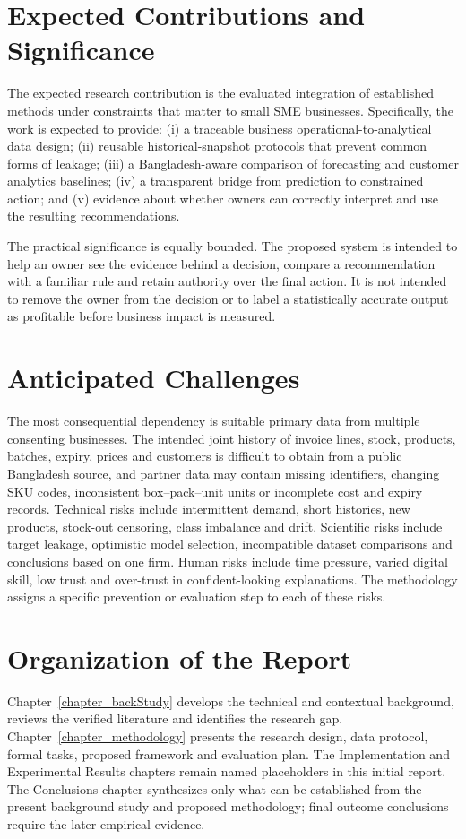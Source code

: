 \section{Expected Contributions and Significance}

The expected research contribution is the evaluated integration of established
methods under constraints that matter to small SME businesses. Specifically, the
  work is expected to provide: (i) a traceable business operational-to-analytical data
design; (ii) reusable historical-snapshot protocols that prevent common forms
of leakage; (iii) a Bangladesh-aware comparison of forecasting and customer
analytics baselines; (iv) a transparent bridge from prediction to constrained
action; and (v) evidence about whether owners can correctly interpret and use
the resulting recommendations.

The practical significance is equally bounded. The proposed system is intended
to help an owner see the evidence behind a decision, compare a recommendation
with a familiar rule and retain authority over the final action. It is not
intended to remove the owner from the decision or to label a statistically
accurate output as profitable before business impact is measured.

\section{Anticipated Challenges}

The most consequential dependency is suitable primary data from multiple
consenting businesses. The intended joint history of invoice lines, stock,
products, batches, expiry, prices and customers is difficult to obtain from a
public Bangladesh source, and partner data may contain missing identifiers,
changing SKU codes, inconsistent box--pack--unit units or incomplete cost and
expiry records. Technical risks
include intermittent demand, short histories, new products, stock-out censoring,
class imbalance and drift. Scientific risks include target leakage, optimistic
model selection, incompatible dataset comparisons and conclusions based on one
firm. Human risks include time pressure, varied digital skill, low trust and
over-trust in confident-looking explanations. The methodology assigns a
specific prevention or evaluation step to each of these risks.

\section{Organization of the Report}

Chapter~\ref{chapter_backStudy} develops the technical and contextual
background, reviews the verified literature and identifies the research gap.
Chapter~\ref{chapter_methodology} presents the research design, data protocol,
formal tasks, proposed framework and evaluation plan.
The Implementation and Experimental Results chapters remain named placeholders
in this initial report. The Conclusions chapter synthesizes only what can be
established from the present background study and proposed methodology; final
outcome conclusions require the later empirical evidence.
